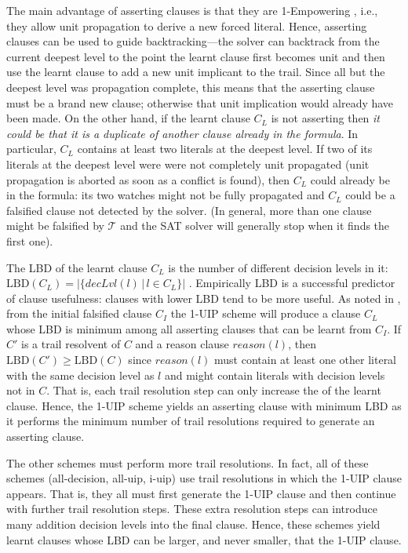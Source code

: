 \documentclass[runningheads]{llncs}
\newcommand{\sat}{SAT\xspace}
\newcommand{\LBD}{\text{LBD}\xspace}
\newcommand{\trail}{\ensuremath{\mathcal{T}}}
\newcommand{\dlevel}[1]{\ensuremath{\mathit{decLvl}(#1)}}
\newcommand{\reason}[1]{\ensuremath{\mathit{reason}(#1)}}
\newcommand{\nf}[1]{{\color{red}{#1}}}
\begin{document}
The main advantage of asserting clauses is that they are 1-Empowering
\cite{DBLP:journals/ai/PipatsrisawatD11}, i.e., they allow unit
propagation to derive a new forced literal. Hence, asserting clauses
can be used to guide backtracking---the solver can backtrack from the
current deepest level to the point the learnt clause first becomes
unit\nf{,} and then use the learnt clause to add a new unit implicant to the
trail. Since all but the deepest level was propagation complete, this
means that the asserting clause must be a brand new clause; otherwise
that unit implication would already have been made. On the other hand,
if the learnt clause $C_L$ is not asserting then \emph{it could be
  that it is a duplicate of another clause already in the formula}. In
particular, $C_L$ contains at least two literals at the deepest level.
If two of its literals at the deepest level were were not completely
unit propagated (unit propagation is aborted as soon as a conflict is
found), then $C_L$ could already be in the formula: its two watches
might not be fully propagated and $C_L$ could be a falsified clause
not detected by the solver. (In general, more than one clause might be
falsified by $\trail$ and the \sat solver will generally stop when it
finds the first one).

The LBD of the learnt clause $C_L$ is the number of different decision
levels in it:
$\LBD(C_L)=\left|\big\{\dlevel{l}\,|\,l \in C_L\big\}\right|$
\cite{DBLP:conf/ijcai/AudemardS09}. Empirically LBD is a successful
predictor of clause usefulness: clauses with lower LBD tend to be more
useful. As noted in \cite{DBLP:conf/ijcai/AudemardS09}, from the
initial falsified clause $C_I$ the 1-UIP scheme will produce a clause
$C_L$ whose LBD is minimum among all asserting clauses that can be
learnt from $C_I$. If $C'$ is a trail resolvent of $C$ and a reason
clause $\reason{l}$, then $\LBD(C') \geq \LBD(C)$ since $\reason{l}$
must contain at least one other literal with the same decision level
as $l$ and might contain literals with decision levels not in
$C$. That is, each trail resolution step can only increase the \LBD of
the learnt clause. Hence, the 1-UIP scheme yields an asserting clause
with minimum LBD as it performs the minimum number of trail resolutions
required to generate an asserting clause.

The other schemes must perform more trail resolutions. In fact, all of
these schemes (all-decision, all-uip, i-uip) use trail resolutions in
which the 1-UIP clause appears. That is, they all must first generate
the 1-UIP clause and then continue with further trail resolution
steps. These extra resolution steps can introduce many addition
decision levels into the final clause. Hence, these schemes yield
learnt clauses whose LBD can be larger, and never smaller, that the
1-UIP clause.
\end{document}
